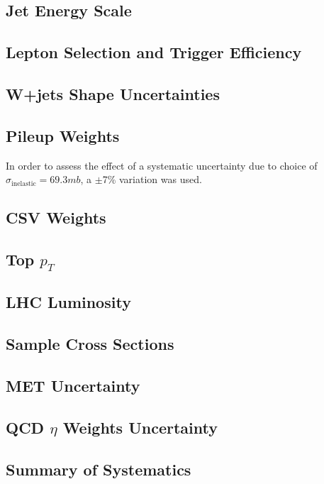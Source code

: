 \subsection{Jet Energy Scale}
\subsection{Lepton Selection and Trigger Efficiency}
\subsection{W+jets Shape Uncertainties}
\subsection{Pileup Weights}
In order to assess the effect of a systematic uncertainty due to choice of $\sigma_{\text{inelastic}}=69.3\unit{mb}$, a $\pm$7\% variation was used.
\subsection{CSV Weights}
\subsection{Top \texorpdfstring{$p_{T}$}{pT}}
\subsection{LHC Luminosity}
\subsection{Sample Cross Sections}
\subsection{MET Uncertainty }
\subsection{QCD \texorpdfstring{$\eta$}{eta} Weights Uncertainty}
\subsection{Summary of Systematics}

